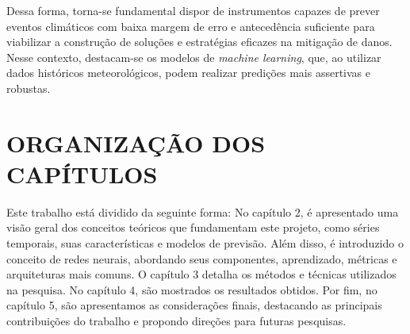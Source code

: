     
    Dessa forma, torna-se fundamental dispor de instrumentos capazes de prever eventos climáticos com baixa margem de erro 
    e antecedência suficiente para viabilizar a construção de soluções e estratégias eficazes na mitigação de danos. 
    Nesse contexto, destacam-se os modelos de \emph{machine learning}, que, ao utilizar dados históricos meteorológicos, podem 
    realizar predições mais assertivas e robustas.
    
\section{ORGANIZAÇÃO DOS CAPÍTULOS}
    Este trabalho está dividido da seguinte forma: No capítulo 2, é apresentado uma visão geral dos conceitos teóricos que 
    fundamentam este projeto, como séries temporais, suas características e modelos de previsão. Além disso, é introduzido o 
    conceito de redes neurais, abordando seus componentes, aprendizado, métricas e arquiteturas mais comuns. O capítulo 3 
    detalha os métodos e técnicas utilizados na pesquisa. No capítulo 4, são mostrados os resultados obtidos. Por fim, no 
    capítulo 5, são apresentamos as considerações finais, destacando as principais contribuições do trabalho e propondo direções 
    para futuras pesquisas.